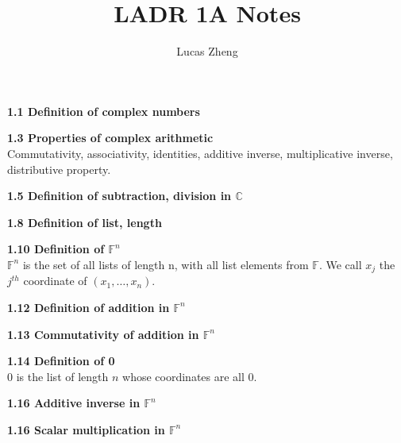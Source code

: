 \documentclass[12pt, letterpaper]{article}
\title{LADR 1A Notes}
\author{Lucas Zheng}
\date{}
\begin{document}
\maketitle

\textbf{1.1 Definition of complex numbers}

\textbf{1.3 Properties of complex arithmetic}\\
Commutativity, associativity, identities, additive inverse, multiplicative inverse, distributive property.

\textbf{1.5 Definition of subtraction, division in $\mathbb{C}$}

\textbf{1.8 Definition of list, length}

\textbf{1.10 Definition of $\mathbb{F}^n$}\\
$\mathbb{F}^n$ is the set of all lists of length n, with all list elements from $\mathbb{F}$.
We call $x_j$ the $j^{th}$ coordinate of $(x_1,\ldots,x_n)$.

\textbf{1.12 Definition of addition in $\mathbb{F}^n$}

\textbf{1.13 Commutativity of addition in $\mathbb{F}^n$}

\textbf{1.14 Definition of 0}\\
0 is the list of length $n$ whose coordinates are all 0.

\textbf{1.16 Additive inverse in $\mathbb{F}^n$}

\textbf{1.16 Scalar multiplication in $\mathbb{F}^n$}
\end{document}
